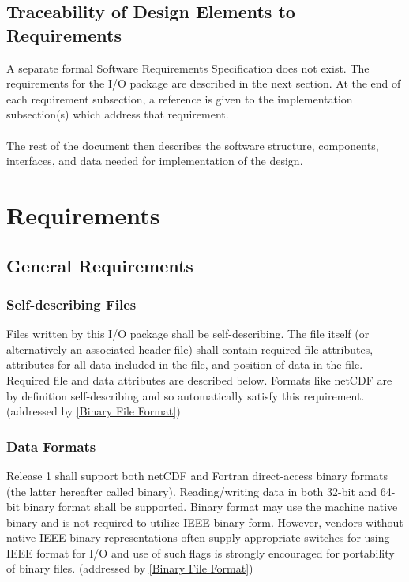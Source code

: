 \documentclass[11pt]{article}
\begin{document}
\subsection{Traceability of Design Elements to Requirements}
A separate formal Software Requirements Specification does not exist.
The requirements for the I/O package are described in the next 
section.  At the end of each requirement subsection, a reference 
is given to the implementation subsection(s) which address that requirement.
\paragraph{}
The rest of the document then describes the software structure, 
components, interfaces, and data needed for implementation of 
the design.

\section{Requirements}

\subsection{General Requirements}

\subsubsection{Self-describing Files}
\label{Self-describing Files}
Files written by this I/O package shall be self-describing.  
The file itself (or alternatively an associated header file) 
shall contain required file attributes, attributes for all data 
included in the file, and position of data in the file.  
Required file and data attributes are described below.  
Formats like netCDF are by definition self-describing 
and so automatically satisfy this requirement.
(addressed by \ref{Binary File Format})

\subsubsection{Data Formats}
\label{Data Formats}
Release 1 shall support both netCDF and Fortran direct-access 
binary formats (the latter hereafter called binary).  
Reading/writing data in both 32-bit and 64-bit 
binary format shall be supported.  
Binary format may use the machine native binary and 
is not required to utilize IEEE binary form.  
However, vendors without native IEEE binary representations 
often supply appropriate switches for using IEEE format 
for I/O and use of such flags is strongly encouraged for 
portability of binary files.
(addressed by \ref{Binary File Format})
\end{document}
